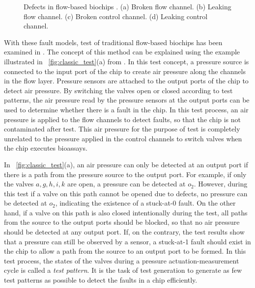 \begin{figure}[t]
{\figurefontsize
\centering

\caption{Defects in flow-based biochips \cite{HuYHC14}. (a) Broken flow channel. (b) Leaking flow channel. (c) Broken control channel. (d) Leaking control channel.}
\label{fig:defects}
}
\end{figure}

With these fault models, test of traditional flow-based biochips has been
examined in \cite{HuYHC14}. The concept of this method can be explained
using the example illustrated in \figname~\ref{fig:classic_test}(a) from
\cite{HuYHC14}. In this test concept, a pressure source is connected to the
input port of the chip to create air pressure along the channels in the flow
layer. Pressure sensors are attached to the output ports of the chip to detect air
pressure. By switching the valves open or closed according to test patterns,
the air pressure read by the pressure sensors 
at the output ports can be used to determine whether
there is a fault in the chip. In this test process, an air pressure is applied
to the flow channels to detect faults, so that the chip is not
contaminated after test. This air pressure for the purpose of test 
is completely unrelated to the pressure applied in the control channels to 
switch valves when the chip executes bioassays.

In \figname~\ref{fig:classic_test}(a), an air pressure can only be detected at
an output port if there is a path from the pressure source to the output port. For example,
if only the valves $a, g, h, i, k$ are open,  a pressure can be detected
at $o_2$. However, during this test if a valve on this path cannot be opened due to
defects, no pressure can be detected at $o_2$, indicating the
existence of a stuck-at-0 fault. On the other hand, if a valve on this path is also
closed intentionally during the test, all paths from the source to the output
ports should be blocked,
so that no air pressure should be detected at any output port. If, on the
contrary, the test results show that a pressure can still be observed by a
sensor, a stuck-at-1 fault should exist in the chip to allow a path from the
source to an output port to be formed. In this test process,   
the states of the valves during a pressure actuation-measurement cycle is
called a \textit{test pattern}. It is the task of test generation to generate
as few test patterns as possible to detect the faults in a chip efficiently.

